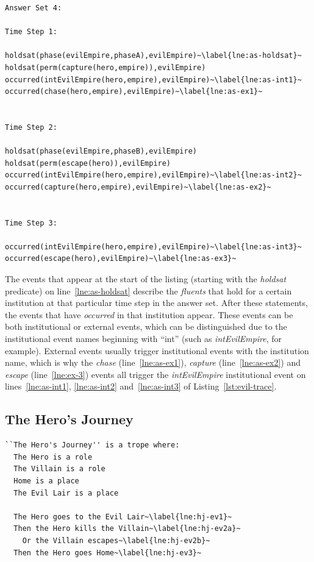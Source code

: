 \documentclass[11pt]{report}
\begin{document}
\begin{lstlisting}[label={lst:evil-trace}, caption={Example trace for the ``Evil
Empire'' trope}, escapechar=\~]
Answer Set 4:

Time Step 1:

holdsat(phase(evilEmpire,phaseA),evilEmpire)~\label{lne:as-holdsat}~
holdsat(perm(capture(hero,empire)),evilEmpire)
occurred(intEvilEmpire(hero,empire),evilEmpire)~\label{lne:as-int1}~
occurred(chase(hero,empire),evilEmpire)~\label{lne:as-ex1}~


Time Step 2:

holdsat(phase(evilEmpire,phaseB),evilEmpire)
holdsat(perm(escape(hero)),evilEmpire)
occurred(intEvilEmpire(hero,empire),evilEmpire)~\label{lne:as-int2}~
occurred(capture(hero,empire),evilEmpire)~\label{lne:as-ex2}~


Time Step 3:

occurred(intEvilEmpire(hero,empire),evilEmpire)~\label{lne:as-int3}~
occurred(escape(hero),evilEmpire)~\label{lne:as-ex3}~
\end{lstlisting}

The events that appear at the start of the listing (starting with the
\emph{holdsat} predicate) on line~\ref{lne:as-holdsat} describe the \emph{fluents} that hold for a certain
institution at that particular time step in the answer set. After these
statements, the events that have \emph{occurred} in that institution appear.
These events can be both institutional or external events, which can be
distinguished due to the institutional event names beginning with ``int'' (such
as \emph{intEvilEmpire}, for example). External events usually trigger
institutional events with the institution name, which is why the \emph{chase} (line~\ref{lne:as-ex1}),
\emph{capture} (line~\ref{lne:as-ex2}) and \emph{escape} (line~\ref{lne:ex-3}) events all trigger the \emph{intEvilEmpire}
institutional event on lines~\ref{lne:as-int1}, \ref{lne:as-int2} and~\ref{lne:as-int3} of Listing~\ref{lst:evil-trace}.

\subsection{The Hero's Journey}

\begin{lstlisting}[showstringspaces=false, escapechar=\~]
``The Hero's Journey'' is a trope where:
  The Hero is a role
  The Villain is a role
  Home is a place
  The Evil Lair is a place

  The Hero goes to the Evil Lair~\label{lne:hj-ev1}~
  Then the Hero kills the Villain~\label{lne:hj-ev2a}~
    Or the Villain escapes~\label{lne:hj-ev2b}~
  Then the Hero goes Home~\label{lne:hj-ev3}~
\end{lstlisting}
\end{document}
